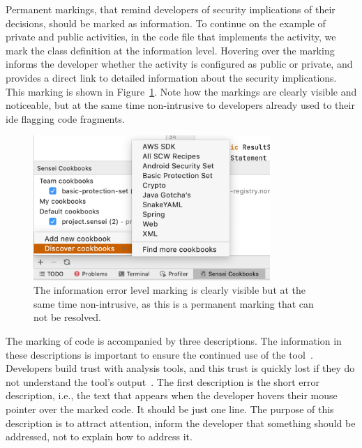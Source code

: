 Permanent markings, that remind developers of security implications of their decisions, should be marked as information.
To continue on the example of private and public activities, in the code file that implements the activity, we mark the class definition at the information level.
Hovering over the marking informs the developer whether the activity is configured as public or private, and provides a direct link to detailed information about the security implications.
This marking is shown in Figure~\ref{fig:infomarking}.
Note how the markings are clearly visible and noticeable, but at the same time non-intrusive to developers already used to their \gls{ide} flagging code fragments.

\begin{figure}
  \centering
  \includegraphics[width=0.8\textwidth,page=10]{04-tools/figures/figures1.pdf}
  \caption[Marking at the information error level]{The information error level marking is clearly visible but at the same time non-intrusive, as this is a permanent marking that can not be resolved.}
  \label{fig:infomarking} 
\end{figure}

The marking of code is accompanied by three descriptions.
The information in these descriptions is important to ensure the continued use of the tool~\cite{whitney2018embedding,layman2007toward}.
Developers build trust with analysis tools, and this trust is quickly lost if they do not understand the tool’s output~\cite{bessey2010few}.
The first description is the short error description, i.e., the text that appears when the developer hovers their mouse pointer over the marked code.
It should be just one line.
The purpose of this description is to attract attention, inform the developer that something should be addressed, not to explain how to address it.

